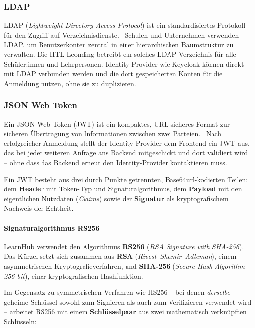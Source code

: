 \subsubsection{LDAP}

LDAP (\textit{Lightweight Directory Access Protocol}) ist ein
standardisiertes Protokoll für den Zugriff auf
Verzeichnisdienste.~\cite{ldap-rfc} Schulen und Unternehmen verwenden
LDAP, um Benutzerkonten zentral in einer hierarchischen Baumstruktur
zu verwalten. Die HTL Leonding betreibt ein solches LDAP-Verzeichnis
für alle Schüler:innen und Lehrpersonen. Identity-Provider wie Keycloak
können direkt mit LDAP verbunden werden und die dort gespeicherten
Konten für die Anmeldung nutzen, ohne sie zu
duplizieren.~\cite{ldap-rfc}

\subsubsection{JSON Web Token}

Ein JSON Web Token (JWT) ist ein kompaktes, URL-sicheres Format zur
sicheren Übertragung von Informationen zwischen zwei
Parteien.~\cite{jwt-rfc} Nach erfolgreicher Anmeldung stellt der
Identity-Provider dem Frontend ein JWT aus, das bei jeder weiteren
Anfrage ans Backend mitgeschickt und dort validiert wird -- ohne dass
das Backend erneut den Identity-Provider kontaktieren
muss.~\cite{jwt-best-practices}

Ein JWT besteht aus drei durch Punkte getrennten, Base64url-kodierten
Teilen:~\cite{jwt-rfc} dem \textbf{Header} mit Token-Typ und
Signaturalgorithmus, dem \textbf{Payload} mit den eigentlichen Nutzdaten
(\textit{Claims}) sowie der \textbf{Signatur} als kryptografischem
Nachweis der Echtheit.

\paragraph{Signaturalgorithmus RS256}

LearnHub verwendet den Algorithmus \textbf{RS256}
(\textit{RSA Signature with SHA-256}).~\cite{jwt-rfc} Das Kürzel setzt
sich zusammen aus \textbf{RSA} (\textit{Rivest--Shamir--Adleman}), einem
asymmetrischen Kryptografieverfahren, und \textbf{SHA-256}
(\textit{Secure Hash Algorithm 256-bit}), einer kryptografischen
Hashfunktion.~\cite{jwt-rfc}

Im Gegensatz zu symmetrischen Verfahren wie HS256 -- bei denen
\textit{derselbe} geheime Schlüssel sowohl zum Signieren als auch zum
Verifizieren verwendet wird -- arbeitet RS256 mit einem
\textbf{Schlüsselpaar} aus zwei mathematisch verknüpften Schlüsseln:

